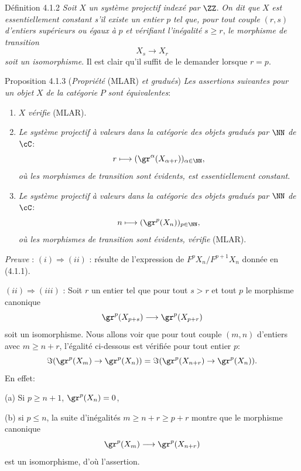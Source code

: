 \begin{statement}{Définition 4.1.2}
\emph{Soit} $X$ \emph{un système projectif indexé par} $\ZZ$. \emph{On dit que} $X$ \emph{est essentiellement constant s'il existe un entier} $p$ \emph{tel que, pour tout couple} $(r,s)$ \emph{d'entiers supérieurs ou égaux à} $p$ \emph{et vérifiant l'inégalité} $s\ge r$, \emph{le morphisme de transition}
\[
X_s\longrightarrow X_r
\]
\emph{soit un isomorphisme}. Il est clair qu'il suffit de le demander lorsque $r=p$.
\end{statement}

\begin{statement}{Proposition 4.1.3 (\emph{Propriété} (MLAR) \emph{et gradués})}
\emph{Les assertions suivantes pour un objet} $X$ \emph{de la catégorie} $P$ \emph{sont équivalentes}:
\begin{enumerate}[label=(\roman*)]
\item $X$ \emph{vérifie} (MLAR).
\item \emph{Le système projectif à valeurs dans la catégorie des objets gradués par} $\NN$ \emph{de} $\cC$:
\[
r\longmapsto (\gr^\alpha(X_{\alpha+r}))_{\alpha\in\NN},
\]
\emph{où les morphismes de transition sont évidents, est essentiellement constant}.
\item \emph{Le système projectif à valeurs dans la catégorie des objets gradués par} $\NN$ \emph{de} $\cC$:
\[
n\longmapsto (\gr^p(X_n))_{p\in\NN},
\]
\emph{où les morphismes de transition sont évidents, vérifie} (MLAR).
\end{enumerate}
\end{statement}

\emph{Preuve} : $(i)\Rightarrow(ii)$ : résulte de l'expression de $F^pX_n/F^{p+1}X_n$ donnée en (4.1.1).

$(ii)\Rightarrow(iii)$ : Soit $r$ un entier tel que pour tout $s>r$ et tout $p$ le morphisme canonique
\[
\gr^p(X_{p+s})\longrightarrow \gr^p(X_{p+r})
\]
soit un isomorphisme. Nous allons voir que pour tout couple $(m,n)$ d'entiers avec $m\ge n+r$, l'égalité ci-dessous est vérifiée pour tout entier $p$:
\[
\Im(\gr^p(X_m)\to\gr^p(X_n))=
\Im(\gr^p(X_{n+r})\to\gr^p(X_n)).
\]
En effet:

(a) Si $p\ge n+1$, $\gr^p(X_n)=0$,

(b) si $p\le n$, la suite d'inégalités $m\ge n+r\ge p+r$ montre que le morphisme canonique
\[
\gr^p(X_m)\longrightarrow\gr^p(X_{n+r})
\]
est un isomorphisme, d'où l'assertion.


